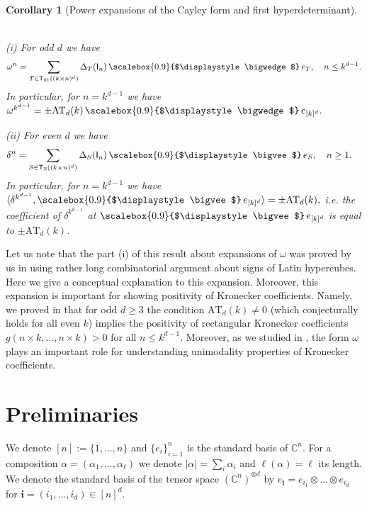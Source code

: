 \documentclass[12pt, reqno]{amsart}
\newtheorem{corollary}[theorem]{Corollary}
\theoremstyle{definition}
\newcommand{\dett}{\mathrm{det}}
\let\oldbigwedge\bigwedge
\let\oldbigvee\bigvee
\renewcommand{\bigwedge}{
  \mathop{
    \vcenter{
      \hbox{\scalebox{0.9}{$\displaystyle\oldbigwedge$}}
    }
  }
}
\renewcommand{\bigvee}{
  \mathop{
    \vcenter{
      \hbox{\scalebox{0.9}{$\displaystyle\oldbigvee$}}
    }
  }
}
\begin{document}
\begin{corollary}[Power expansions of the Cayley form and first hyperdeterminant]
~ %

(i) For odd $d$ we have %
$$
\omega^n = \sum_{T \in \mathsf{T}_{01}((k \times n)^d)} \Delta_T(\mathsf{I}_n) \bigwedge e_T, \quad n \le k^{d-1}.
$$
In particular, for $n = k^{d-1}$ we have 
$
\omega^{k^{d-1}} = \pm \mathrm{AT}_d(k) \bigwedge e_{[k]^d}.
$

(ii) For even $d$ we have %
    $$
        \delta^n = \sum_{S \in \mathsf{T}_{\mathbb{N}}((k \times n)^d)} \Delta_{S}(\mathsf{I}_n) \bigvee 
        e_S, \quad n \ge 1. \quad
    $$
    In particular, for $n = k^{d-1}$ we have 
    $
    \langle \delta^{k^{d-1}}, \bigvee e_{[k]^d} \rangle = \pm \mathrm{AT}_d(k),
    $
    i.e. the coefficient of $\delta^{k^{d-1}}$ %
    at $\bigvee e_{[k]^d}$ is equal to $\pm \mathrm{AT}_d(k)$.

\end{corollary}

Let us note that the part (i) of this result about expansions of $\omega$ was proved by us in \cite{ayfund} using rather long  combinatorial argument about signs of Latin hypercubes. Here we give a conceptual explanation to this expansion. Moreover, this expansion is important for showing positivity of Kronecker coefficients. Namely, we proved in \cite{ayfund} that for odd $d \ge 3$ the condition $\mathrm{AT}_d(k) \ne 0$ (which conjecturally holds for all even $k$) 
implies the positivity of rectangular Kronecker coefficients $g(n \times k, \ldots, n \times k) > 0$ for all $n \le k^{d-1}$. Moreover, as we studied in \cite{ayuni}, the form $\omega$ plays an important role for understanding  unimodality properties of Kronecker coefficients.




\section{Preliminaries}
We denote $[n] := \{ 1, \ldots, n\}$ and $\{e_{i}\}_{i=1}^{n}$ is the standard basis of $\mathbb{C}^{n}$. For a composition $\alpha = (\alpha_1, \ldots, \alpha_{\ell})$ we denote $|\alpha| = \sum_{i} \alpha_i$ and $\ell(\alpha) = \ell$ its length. We denote the standard basis of the tensor space $(\mathbb{C}^n)^{\otimes d}$ by $e_{\mathbf{i}} = e_{i_1}\otimes\ldots\otimes e_{i_d}$ for $\mathbf{i} = (i_1,\ldots,i_d) \in [n]^d$.
\end{document}

